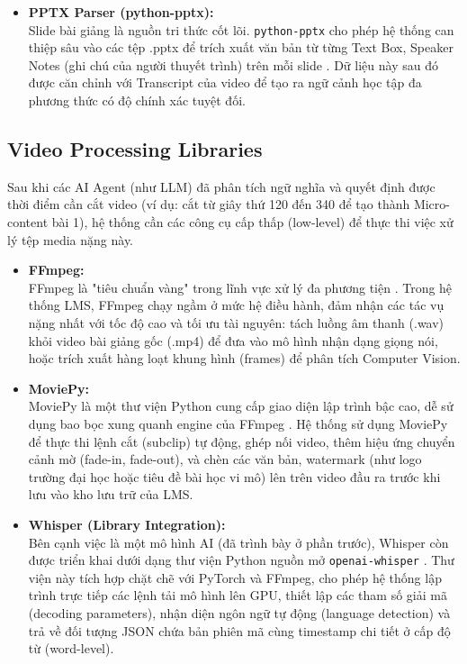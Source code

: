 \begin{itemize}
    \item[\textbf{e.}] \textbf{PPTX Parser (python-pptx):} \\
    Slide bài giảng là nguồn tri thức cốt lõi. \texttt{python-pptx} cho phép hệ thống can thiệp sâu vào các tệp .pptx để trích xuất văn bản từ từng Text Box, Speaker Notes (ghi chú của người thuyết trình) trên mỗi slide \cite{python_pptx2024}. Dữ liệu này sau đó được căn chỉnh với Transcript của video để tạo ra ngữ cảnh học tập đa phương thức có độ chính xác tuyệt đối.
\end{itemize}

\subsection{Video Processing Libraries}
Sau khi các AI Agent (như LLM) đã phân tích ngữ nghĩa và quyết định được thời điểm cần cắt video (ví dụ: cắt từ giây thứ 120 đến 340 để tạo thành Micro-content bài 1), hệ thống cần các công cụ cấp thấp (low-level) để thực thi việc xử lý tệp media nặng này.

\begin{itemize}
    \item[\textbf{a.}] \textbf{FFmpeg:} \\
    FFmpeg là "tiêu chuẩn vàng" trong lĩnh vực xử lý đa phương tiện \cite{tomar2006converting}. Trong hệ thống LMS, FFmpeg chạy ngầm ở mức hệ điều hành, đảm nhận các tác vụ nặng nhất với tốc độ cao và tối ưu tài nguyên: tách luồng âm thanh (.wav) khỏi video bài giảng gốc (.mp4) để đưa vào mô hình nhận dạng giọng nói, hoặc trích xuất hàng loạt khung hình (frames) để phân tích Computer Vision.
    
    \item[\textbf{b.}] \textbf{MoviePy:} \\
    MoviePy là một thư viện Python cung cấp giao diện lập trình bậc cao, dễ sử dụng bao bọc xung quanh engine của FFmpeg \cite{moviepy2024}. Hệ thống sử dụng MoviePy để thực thi lệnh cắt (subclip) tự động, ghép nối video, thêm hiệu ứng chuyển cảnh mờ (fade-in, fade-out), và chèn các văn bản, watermark (như logo trường đại học hoặc tiêu đề bài học vi mô) lên trên video đầu ra trước khi lưu vào kho lưu trữ của LMS.
    
    \item[\textbf{c.}] \textbf{Whisper (Library Integration):} \\
    Bên cạnh việc là một mô hình AI (đã trình bày ở phần trước), Whisper còn được triển khai dưới dạng thư viện Python nguồn mở \texttt{openai-whisper} \cite{radford2023robust}. Thư viện này tích hợp chặt chẽ với PyTorch và FFmpeg, cho phép hệ thống lập trình trực tiếp các lệnh tải mô hình lên GPU, thiết lập các tham số giải mã (decoding parameters), nhận diện ngôn ngữ tự động (language detection) và trả về đối tượng JSON chứa bản phiên mã cùng timestamp chi tiết ở cấp độ từ (word-level).
\end{itemize}

